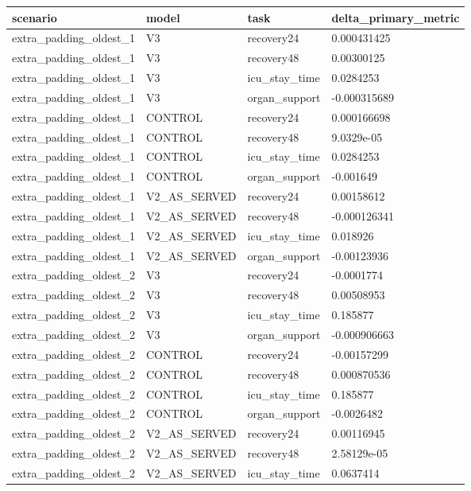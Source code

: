 \begin{tabular}{llll}
\hline
scenario & model & task & delta\_primary\_metric \\
\hline
extra\_padding\_oldest\_1 & V3 & recovery24 & 0.000431425 \\
extra\_padding\_oldest\_1 & V3 & recovery48 & 0.00300125 \\
extra\_padding\_oldest\_1 & V3 & icu\_stay\_time & 0.0284253 \\
extra\_padding\_oldest\_1 & V3 & organ\_support & -0.000315689 \\
extra\_padding\_oldest\_1 & CONTROL & recovery24 & 0.000166698 \\
extra\_padding\_oldest\_1 & CONTROL & recovery48 & 9.0329e-05 \\
extra\_padding\_oldest\_1 & CONTROL & icu\_stay\_time & 0.0284253 \\
extra\_padding\_oldest\_1 & CONTROL & organ\_support & -0.001649 \\
extra\_padding\_oldest\_1 & V2\_AS\_SERVED & recovery24 & 0.00158612 \\
extra\_padding\_oldest\_1 & V2\_AS\_SERVED & recovery48 & -0.000126341 \\
extra\_padding\_oldest\_1 & V2\_AS\_SERVED & icu\_stay\_time & 0.018926 \\
extra\_padding\_oldest\_1 & V2\_AS\_SERVED & organ\_support & -0.00123936 \\
extra\_padding\_oldest\_2 & V3 & recovery24 & -0.0001774 \\
extra\_padding\_oldest\_2 & V3 & recovery48 & 0.00508953 \\
extra\_padding\_oldest\_2 & V3 & icu\_stay\_time & 0.185877 \\
extra\_padding\_oldest\_2 & V3 & organ\_support & -0.000906663 \\
extra\_padding\_oldest\_2 & CONTROL & recovery24 & -0.00157299 \\
extra\_padding\_oldest\_2 & CONTROL & recovery48 & 0.000870536 \\
extra\_padding\_oldest\_2 & CONTROL & icu\_stay\_time & 0.185877 \\
extra\_padding\_oldest\_2 & CONTROL & organ\_support & -0.0026482 \\
extra\_padding\_oldest\_2 & V2\_AS\_SERVED & recovery24 & 0.00116945 \\
extra\_padding\_oldest\_2 & V2\_AS\_SERVED & recovery48 & 2.58129e-05 \\
extra\_padding\_oldest\_2 & V2\_AS\_SERVED & icu\_stay\_time & 0.0637414 \\

\end{tabular}
